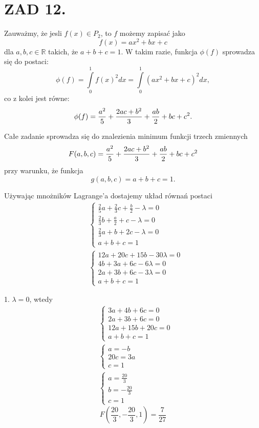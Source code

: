 \documentclass{article}[13pt]
\newcommand{\R}{\mathds{R}}
\begin{document}
    \section*{ZAD 12.}

    Zauważmy, że jesli $f(x)\in P_2$, to $f$ możemy zapisać jako
    $$f(x)=ax^2+bx+c$$
    dla $a,b,c\in\R$ takich, że $a+b+c=1$. W takim razie, funkcja $\phi(f)$ sprowadza się do postaci:
    $$\phi(f)=\int\limits_0^1f(x)^2dx=\int\limits_0^1(ax^2+bx+c)^2dx,$$
    co z kolei jest równe:
    $$\phi(f)={a^2\over5}+{2ac+b^2\over3}+{ab\over2}+bc+c^2.$$

    Całe zadanie sprowadza się do znalezienia minimum funkcji trzech zmiennych
    $$F(a,b,c)={a^2\over5}+{2ac+b^2\over3}+{ab\over2}+bc+c^2$$
    przy warunku, że funkcja
    $$g(a,b,c)=a+b+c=1.$$

    Używając mnożników Lagrange'a dostajemy układ równań postaci
    \begin{align*}
        &\begin{cases}
            \frac25a+\frac23c+\frac b2-\lambda=0\\
            \frac23b+\frac a2+c-\lambda=0\\
            \frac23a+b+2c-\lambda=0\\
            a+b+c=1
        \end{cases}\\
        &\begin{cases}
            12a+20c+15b-30\lambda=0\\
            4b+3a+6c-6\lambda=0\\
            2a+3b+6c-3\lambda=0\\
            a+b+c=1
        \end{cases}
    \end{align*}

    {\color{def}1. $\lambda=0$}, wtedy
    \begin{align*}
        &\begin{cases}
            3a+4b+6c=0\\
            2a+3b+6c=0\\
            12a+15b+20c=0\\
            a+b+c=1
        \end{cases}\\
        &\begin{cases}
            a=-b\\
            20c=3a\\
            c=1
        \end{cases}\\
        &\begin{cases}
            a=\frac{20}3\\
            b=-\frac{20}3\\
            c=1
        \end{cases}
    \end{align*}
        $$F(\frac{20}3,-\frac{20}3,1)=\frac7{27}$$
\end{document}
